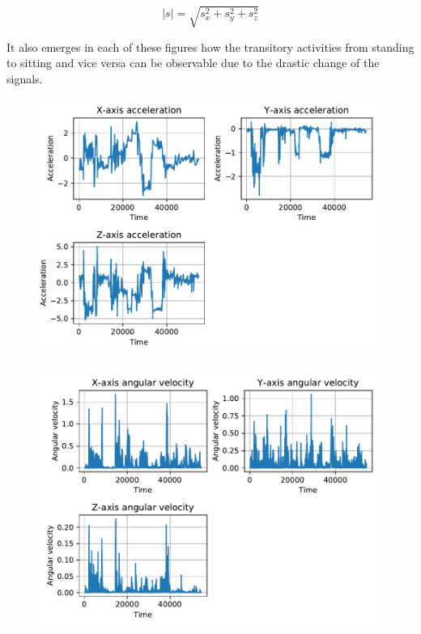 \begin{equation}
|s| = \sqrt{s_x^2+s_y^2+s_z^2}
\label{eq:norm}
\end{equation}


It also emerges in each of these figures how the transitory activities from standing to sitting and vice versa can be observable due to the drastic change of the signals.

\begin{figure}[htp]
\includegraphics[scale=0.55]{acceleration_susanna.pdf}
\caption{}
\label{fig:acc}
\end{figure}

\begin{figure}[htp]
\includegraphics[scale=0.55]{angular_velocity_susanna.pdf}
\caption{}
\label{fig:gyr}
\end{figure}

